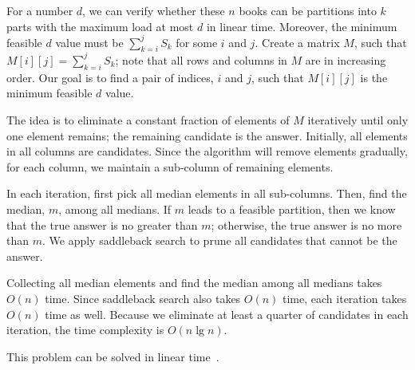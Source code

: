 \begin{Answer}
For a number $d$, we can verify whether these $n$ books can be partitions into $k$ parts with the maximum load at most $d$ in linear time.
Moreover, the minimum feasible $d$ value must be $\sum_{k=i}^j S_k$ for some $i$ and $j$.
Create a matrix $M$, such that $M[i][j] = \sum_{k=i}^j S_k$; note that all rows and columns in $M$ are in increasing order.
Our goal is to find a pair of indices, $i$ and $j$, such that $M[i][j]$ is the minimum feasible $d$ value.

The idea is to eliminate a constant fraction of elements of $M$ iteratively until only one element remains; the remaining candidate is the answer.
Initially, all elements in all columns are candidates.
Since the algorithm will remove elements gradually, for each column, we maintain a sub-column of remaining elements. 

In each iteration, first pick all median elements in all sub-columns. Then, find the median, $m$, among all medians. If $m$ leads to a feasible partition, then we know that the true answer is no greater than $m$; otherwise, the true answer is no more than $m$. We apply saddleback search to prune all candidates that cannot be the answer.

Collecting all median elements and find the median among all medians takes $O(n)$ time. Since saddleback search also takes $O(n)$ time, each iteration takes $O(n)$ time as well. Because we eliminate at least a quarter of candidates in each iteration, the time complexity is $O(n \lg n)$.
\begin{remark}
This problem can be solved in linear time~\cite{Frederickson1991}.
\end{remark}
%
\end{Answer}

